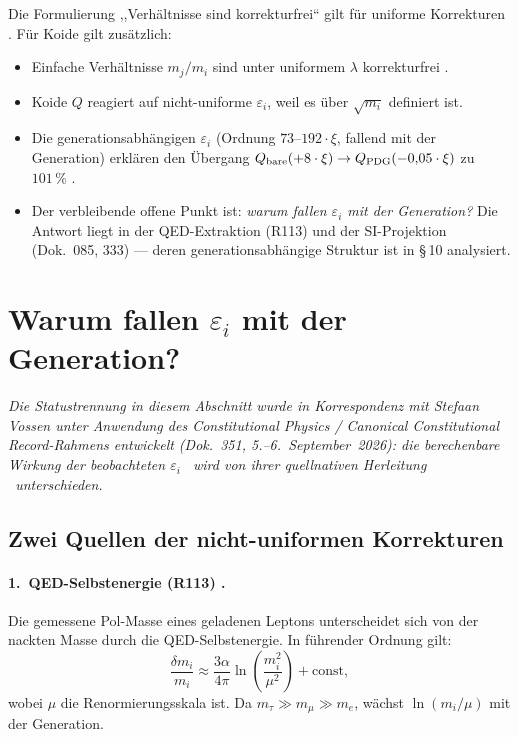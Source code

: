 Die Formulierung ,,Verhältnisse sind korrekturfrei`` gilt für uniforme Korrekturen \BM.
Für Koide gilt zusätzlich:
\begin{itemize}\itemsep2pt
\item Einfache Verhältnisse $m_j/m_i$ sind unter uniformem $\lambda$ korrekturfrei \BM.
\item Koide $Q$ reagiert auf nicht-uniforme $\varepsilon_i$, weil es über $\sqrt{m_i}$
  definiert ist.
\item Die generationsabhängigen $\varepsilon_i$ (Ordnung $73$--$192\cdot\xi$, fallend
  mit der Generation) erklären den Übergang $Q_{\rm bare}(+8\cdot\xi)\to Q_{\rm PDG}(-0{,}05\cdot\xi)$
  zu $101\,\%$ \KM.
\item Der verbleibende offene Punkt ist: \emph{warum fallen $\varepsilon_i$ mit der
  Generation?} Die Antwort liegt in der QED-Extraktion (R113) und der SI-Projektion
  (Dok.~085, 333) --- deren generationsabhängige Struktur ist in §\,10 analysiert.
\end{itemize}

\section{Warum fallen $\varepsilon_i$ mit der Generation?}
\label{sec:eps-herkunft}

\noindent\emph{Die Statustrennung in diesem Abschnitt wurde in Korrespondenz mit
Stefaan Vossen unter Anwendung des Constitutional Physics / Canonical Constitutional
Record-Rahmens entwickelt (Dok.~351, 5.--6.~September~2026): die berechenbare Wirkung
der beobachteten $\varepsilon_i$ \KM\ wird von ihrer quellnativen Herleitung \SM\
unterschieden.}

\subsection*{Zwei Quellen der nicht-uniformen Korrekturen}

\paragraph{1.\ QED-Selbstenergie (R113) \QM.}
Die gemessene Pol-Masse eines geladenen Leptons unterscheidet sich von der nackten
Masse durch die QED-Selbstenergie. In führender Ordnung gilt:
\begin{equation}
  \frac{\delta m_i}{m_i} \approx \frac{3\alpha}{4\pi}
  \ln\!\left(\frac{m_i^2}{\mu^2}\right) + \text{const},
  \label{eq:qed-self}
\end{equation}
wobei $\mu$ die Renormierungsskala ist. Da $m_\tau \gg m_\mu \gg m_e$,
wächst $\ln(m_i/\mu)$ mit der Generation.

